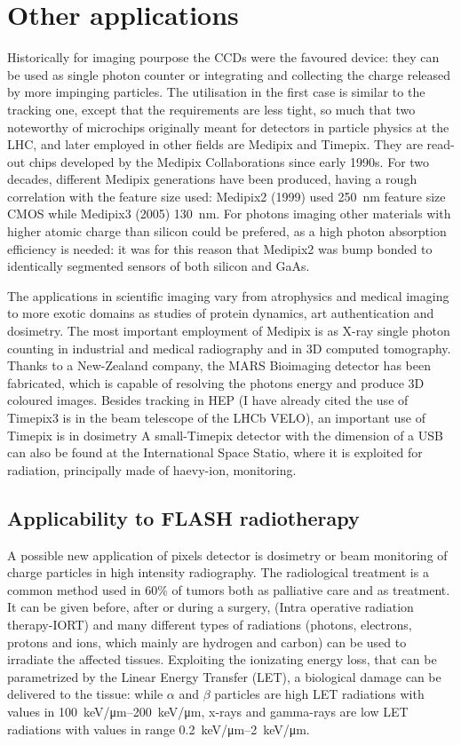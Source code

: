 \section{Other applications}
    Historically for imaging pourpose the CCDs were the favoured device: they can be used as single photon counter or integrating and collecting the charge released by more impinging particles. The utilisation in the first case is similar to the tracking one, except that the requirements are less tight, so much that two noteworthy of microchips originally meant for detectors in particle physics at the LHC, and later employed in other fields are Medipix and Timepix. They are read-out chips developed by the Medipix Collaborations since early 1990s. For two decades, different Medipix generations have been produced, having a rough correlation with the feature size used: Medipix2 (1999) used \SI{250}{nm} feature size CMOS while Medipix3 (2005) \SI{130}{nm}.
    For photons imaging other materials with higher atomic charge than silicon could be prefered, as a high photon absorption efficiency is needed: it was for this reason that Medipix2 was bump bonded to identically segmented sensors of both silicon and GaAs.
    
    The applications in scientific imaging vary from atrophysics and medical imaging to more exotic domains as studies of protein dynamics, art authentication and dosimetry.
    The most important employment of Medipix is as X-ray single photon counting in industrial and medical radiography and in 3D computed tomography. 
    Thanks to a New-Zealand company, the MARS Bioimaging detector has been fabricated, which is capable of resolving the photons energy and produce 3D coloured images.
    Besides tracking in HEP (I have already cited the use of Timepix3 is in the beam telescope of the LHCb VELO), an important use of Timepix is in dosimetry 
    A small-Timepix detector with the dimension of a USB can also be found at the International Space Statio, where it is exploited for radiation, principally made of haevy-ion, monitoring. 
 
    \subsection{Applicability to FLASH radiotherapy}
        A possible new application of pixels detector is dosimetry or beam monitoring of charge particles in high intensity radiography.
        The radiological treatment is a common method used in 60\% of tumors both as palliative care and as treatment. It can be given before, after or during a surgery, (Intra operative radiation therapy-IORT) and many different types of radiations (photons, electrons, protons and ions, which mainly are hydrogen and carbon) can be used to irradiate the affected tissues.
        Exploiting the ionizating energy loss, that can be parametrized by the Linear Energy Transfer (LET), a biological damage can be delivered to the tissue: while $\alpha$ and $\beta$ particles are high LET radiations with values in \SIrange{100}{200}{keV/\um}, x-rays and gamma-rays are low LET radiations with values in range \SIrange{0.2}{2}{keV/\um}.

